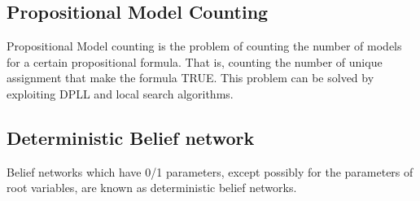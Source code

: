     \subsection{Propositional Model Counting}
    Propositional Model counting is the problem of counting the number of models for a certain propositional formula.\cite{Biere:2009:HSV:1550723-sat-handbook} That is, counting the number of unique assignment that make the formula TRUE. This problem can be solved by exploiting DPLL and local search algorithms.
    
    \subsection{Deterministic Belief network}
    Belief networks which have 0/1 parameters, except possibly for the parameters of root variables, are known as deterministic belief networks.\cite{enc1}
    
    
    